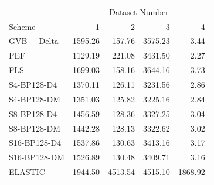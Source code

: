 \begin{tabular}{lrrrr}
\toprule
 & \multicolumn{4}{c}{Dataset Number} \\
Scheme & 1 & 2 & 3 & 4 \\
\midrule
GVB + Delta & 1595.26 & 157.76 & 3575.23 & 3.44 \\
PEF & 1129.19 & 221.08 & 3431.50 & 2.27 \\
FLS & 1699.03 & 158.16 & 3644.16 & 3.73 \\
S4-BP128-D4 & 1370.11 & 126.11 & 3231.56 & 2.86 \\
S4-BP128-DM & 1351.03 & 125.82 & 3225.16 & 2.84 \\
S8-BP128-D4 & 1456.59 & 128.36 & 3327.25 & 3.04 \\
S8-BP128-DM & 1442.28 & 128.13 & 3322.62 & 3.02 \\
S16-BP128-D4 & 1537.86 & 130.63 & 3413.16 & 3.17 \\
S16-BP128-DM & 1526.89 & 130.48 & 3409.71 & 3.16 \\
ELASTIC & 1944.50 & 4513.54 & 4515.10 & 1868.92 \\
\bottomrule
\end{tabular}

